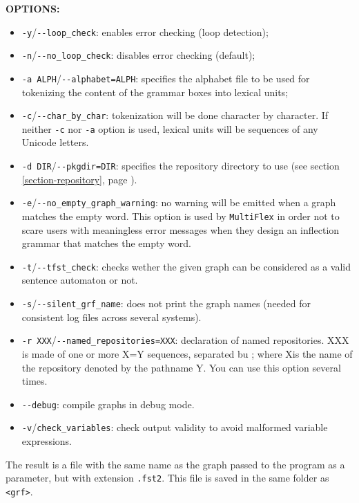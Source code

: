 \bigskip
\noindent \textbf{OPTIONS:}
\begin{itemize}
  \item \verb+-y+/\verb+--loop_check+: enables error checking (loop
  detection);
  \item \verb+-n+/\verb+--no_loop_check+: disables error checking (default);
  \item \verb+-a ALPH+/\verb+--alphabet=ALPH+: specifies the alphabet file to be
  used for tokenizing the content of the grammar boxes into lexical units;
  \item \verb+-c+/\verb+--char_by_char+: tokenization will be done character by
  character. If neither \verb+-c+ nor \verb+-a+ option is used, lexical units 
  will be sequences of any Unicode letters.
  \item \verb+-d DIR+/\verb+--pkgdir=DIR+: specifies the repository directory to
  use (see section \ref{section-repository}, page
  \pageref{section-repository}).
  \item \verb+-e+/\verb+--no_empty_graph_warning+: no warning will be emitted
  when a graph matches the empty word. This option is used by \verb+MultiFlex+
  in order not to scare users with meaningless error messages when they design
  an inflection grammar that matches the empty word. 
  \item \verb+-t+/\verb+--tfst_check+: checks wether the given graph can be
  considered as a valid sentence automaton or not.
  \item \verb+-s+/\verb+--silent_grf_name+: does not print the graph names
  (needed for consistent log files across several systems).
  \item \verb+-r XXX+/\verb+--named_repositories=XXX+: declaration of named
  repositories. XXX is made of one or more X=Y sequences, separated bu ; where
  Xis the name of the repository denoted by the pathname Y. You can use this 
  option several times.
  \item \verb+--debug+: compile graphs in debug mode.
  \item \verb+-v+/\verb+check_variables+: check output validity to avoid malformed variable expressions.
\end{itemize}

\bigskip
\noindent The result is a file with the same name as the graph passed to the
program as a parameter, but with extension \verb+.fst2+. This file is saved in
the same folder as \verb+<grf>+.


